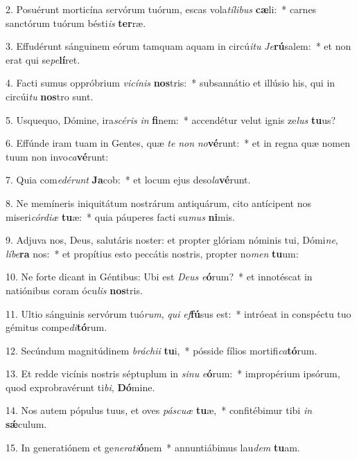 2. Posuérunt morticína servórum tuórum, escas vola\textit{tí}\textit{li}\textit{bus} \textbf{cæ}li:~*  carnes sanctórum tuórum bésti\textit{is} \textbf{ter}ræ.\

3. Effudérunt sánguinem eórum tamquam aquam in circú\textit{i}\textit{tu} \textit{Je}\textbf{rú}salem:~*  et non erat qui se\textit{pe}\textbf{lí}ret.\

4. Facti sumus oppróbrium \textit{vi}\textit{cí}\textit{nis} \textbf{nos}tris:~*  subsannátio et illúsio his, qui in circúi\textit{tu} \textbf{nos}tro sunt.\

5. Usquequo, Dómine, ira\textit{scé}\textit{ris} \textit{in} \textbf{fi}nem:~*  accendétur velut ignis ze\textit{lus} \textbf{tu}us?\

6. Effúnde iram tuam in Gentes, quæ \textit{te} \textit{non} \textit{no}\textbf{vé}runt:~*  et in regna quæ nomen tuum non invo\textit{ca}\textbf{vé}runt:\

7. Quia com\textit{e}\textit{dé}\textit{runt} \textbf{Ja}cob:~*  et locum ejus deso\textit{la}\textbf{vé}runt.\

8. Ne memíneris iniquitátum nostrárum antiquárum, cito antícipent nos miseri\textit{cór}\textit{di}\textit{æ} \textbf{tu}æ:~*  quia páuperes facti su\textit{mus} \textbf{ni}mis.\

9. Adjuva nos, Deus, salutáris noster: et propter glóriam nóminis tui, Dómi\textit{ne}, \textit{lí}\textit{be}\textbf{ra} nos:~*  et propítius esto peccátis nostris, propter no\textit{men} \textbf{tu}um:\

10. Ne forte dicant in Géntibus: Ubi est \textit{De}\textit{us} \textit{e}\textbf{ó}rum?~*  et innotéscat in natiónibus coram ócu\textit{lis} \textbf{nos}tris.\

11. Ultio sánguinis servórum tuó\textit{rum}, \textit{qui} \textit{ef}\textbf{fú}sus est:~*  intróeat in conspéctu tuo gémitus compe\textit{di}\textbf{tó}rum.\

12. Secúndum magnitúdinem \textit{brá}\textit{chi}\textit{i} \textbf{tu}i,~*  pósside fílios mortifi\textit{ca}\textbf{tó}rum.\

13. Et redde vicínis nostris séptuplum in \textit{si}\textit{nu} \textit{e}\textbf{ó}rum:~*  impropérium ipsórum, quod exprobravérunt ti\textit{bi}, \textbf{Dó}mine.\

14. Nos autem pópulus tuus, et oves \textit{pás}\textit{cu}\textit{æ} \textbf{tu}æ,~*  confitébimur tibi \textit{in} \textbf{sǽ}culum.\

15. In generatiónem et ge\textit{ne}\textit{ra}\textit{ti}\textbf{ó}nem~*  annuntiábimus lau\textit{dem} \textbf{tu}am.\

